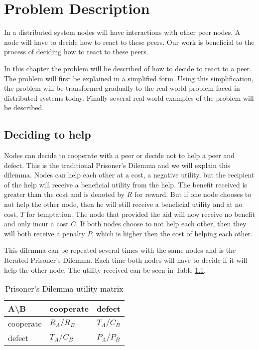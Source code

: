 \chapter{Problem Description}
In a distributed system nodes will have interactions with other peer nodes.
A node will have to decide how to react to these peers.
Our work is beneficial to the process of deciding how to react to these peers.

In this chapter the problem will be described of how to decide to react to a peer.
The problem will first be explained in a simplified form.
Using this simplification, the problem will be transformed gradually
to the real world problem faced in distributed systems today.
Finally several real world examples of the problem will be described.

\section{Deciding to help}
Nodes can decide to cooperate with a peer or decide not to help a peer and defect.
This is the traditional Prisoner's Dilemma 
and we will explain this dilemma\cite{Nowak-PrisonerDilemma}\cite{Lai-Incentives}.
Nodes can help each other at a cost, a negative utility, 
but the recipient of the help will receive a beneficial utility from the help.
The benefit received is greater than the cost and is denoted by $R$ for reward.
But if one node chooses to not help the other node,
 then he will still receive a beneficial utility and at no cost, $T$ for temptation.
The node that provided the aid will now receive no benefit and only incur a cost $C$.
If both nodes choose to not help each other, 
then they will both receive a penalty $P$, which is higher then the cost of helping each other.

This dilemma can be repeated several times with the same nodes and is the Iterated Prisoner's Dilemma.
Each time both nodes will have to decide if it will help the other node.
The utility received can be seen in Table \ref{tab:pd-um}.

\begin{table}[h]
\center
	\begin{tabular}{l|ll}
	A\textbackslash B       & cooperate  & defect     \\ \hline
	cooperate & $R_A /R_B$ & $T_A /C_B$ \\
	defect    & $T_A /C_B$ & $P_A /P_B$
	\end{tabular}
\caption{Prisoner's Dilemma utility matrix}
\label{tab:pd-um}
\end{table}

